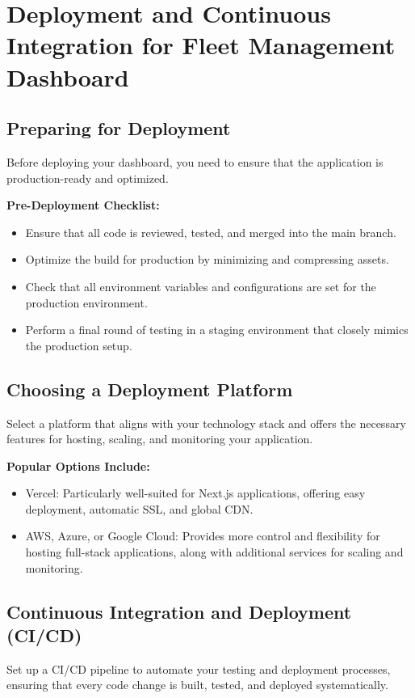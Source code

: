 \section*{Deployment and Continuous Integration for Fleet Management Dashboard}

\subsection*{Preparing for Deployment}
Before deploying your dashboard, you need to ensure that the application is production-ready and optimized.

\textbf{Pre-Deployment Checklist:}
\begin{itemize}
    \item Ensure that all code is reviewed, tested, and merged into the main branch.
    \item Optimize the build for production by minimizing and compressing assets.
    \item Check that all environment variables and configurations are set for the production environment.
    \item Perform a final round of testing in a staging environment that closely mimics the production setup.
\end{itemize}

\subsection*{Choosing a Deployment Platform}
Select a platform that aligns with your technology stack and offers the necessary features for hosting, scaling, and monitoring your application.

\textbf{Popular Options Include:}
\begin{itemize}
    \item Vercel: Particularly well-suited for Next.js applications, offering easy deployment, automatic SSL, and global CDN.
    \item AWS, Azure, or Google Cloud: Provides more control and flexibility for hosting full-stack applications, along with additional services for scaling and monitoring.
\end{itemize}

\subsection*{Continuous Integration and Deployment (CI/CD)}
Set up a CI/CD pipeline to automate your testing and deployment processes, ensuring that every code change is built, tested, and deployed systematically.

